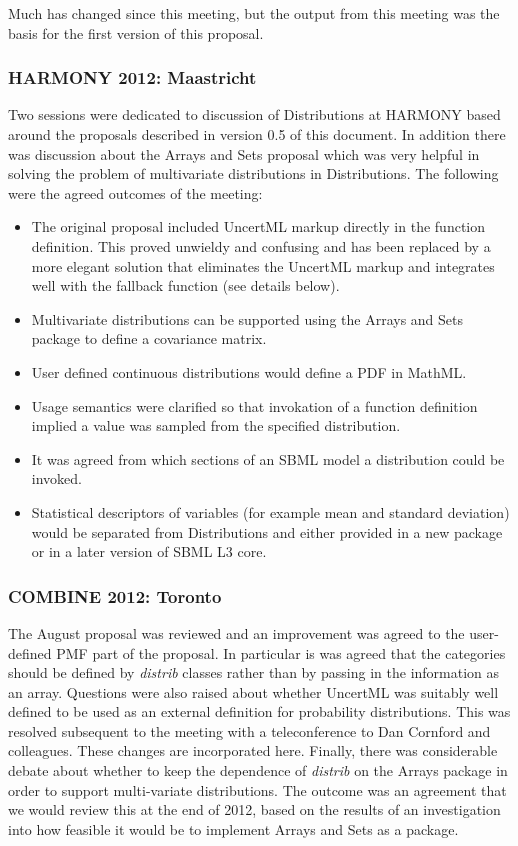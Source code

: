 \documentclass[draftspec]{sbmlpkgspec}
\newcommand{\arrays}{Arrays and Sets\xspace}
\newcommand{\distribshort}{\emph{distrib}\xspace}
\newcommand{\distrib}{Distributions\xspace}
\newcommand{\mathml}{MathML\xspace}
\newcommand{\uncertml}{UncertML\xspace}
\begin{document}
Much has changed since this meeting, but the output from this meeting
was the basis for the first version of this proposal.


\subsubsection{HARMONY 2012: Maastricht}

Two sessions were dedicated to discussion of \distrib at HARMONY based
around the proposals described in version 0.5 of this document. In
addition there was discussion about the \arrays proposal which was
very helpful in solving the problem of multivariate distributions in
\distrib. The following were the agreed outcomes of the meeting:

\begin{itemize}
\item The original proposal included UncertML markup directly in the
  function definition. This proved unwieldy and confusing and has been
  replaced by a more elegant solution that eliminates the UncertML
  markup and integrates well with the fallback function (see details
  below).
\item Multivariate distributions can be supported using the \arrays
  package to define a covariance matrix.
\item User defined continuous distributions would define a PDF in
  \mathml.
\item Usage semantics were clarified so that invokation of a function
  definition implied a value was sampled from the specified
  distribution.
\item It was agreed from which sections of an SBML model a
  distribution could be invoked.
\item Statistical descriptors of variables (for
  example mean and standard deviation) would be separated from
  \distrib and either provided in a new package or in a later version
  of SBML L3 core.
\end{itemize}

\subsubsection{COMBINE 2012: Toronto}

The August proposal was reviewed and an improvement was agreed to
the user-defined PMF part of the proposal. In particular is was agreed
that the categories should be defined by \distribshort classes rather
than by passing in the information as an array. Questions were also raised
about whether \uncertml was suitably well defined to be used as an
external definition for probability distributions. This was resolved
subsequent to the meeting with a teleconference to Dan Cornford and
colleagues. These changes are incorporated here. Finally, there was
considerable debate about whether to keep the dependence of
\distribshort on the Arrays package in order to support multi-variate
distributions. The outcome was an agreement that we would review this
at the end of 2012, based on the results of an investigation
into how feasible it would be to implement \arrays as a package.
\end{document}
